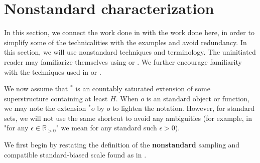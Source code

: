 \documentclass{amsart}
\theoremstyle{definition}
\theoremstyle{remark}
\def \LL{\langle}
\def \RR{\rangle}
\begin{document}
\appendix
\section{Nonstandard characterization}\label{appendix_nonstandad}

In this section, we connect the work done in \cite{nonez2024spectralequivalencesnonstandardsamplings} with the work done here, in order to simplify some of the technicalities with the examples and avoid redundancy. In this section, we will use nonstandard techniques and terminology. The uninitiated reader may familiarize themselves using \cite{nsarecent} or \cite{arkeryd2012nonstandard}. We further encourage familiarity with the techniques used in \cite{nonez2024spectralequivalencesnonstandardsamplings} or \cite{goldbring2025nonstandardapproachdirectintegral}. 

We now assume that ${}^*$ is an countably saturated extension of some superstructure containing at least $H$. When $o$ is an standard object or function, we may note the extension ${}^*o$ by $o$  to lighten the notation. However, for standard sets, we will not use the same shortcut to avoid any ambiguities (for example, in "for any $\epsilon\in\mathbb{R}_{>0}$" we mean for any standard such $\epsilon>0$).

We first begin by restating the definition of the \textbf{nonstandard} sampling and compatible standard-biased scale found as in \cite{nonez2024spectralequivalencesnonstandardsamplings}.
\end{document}
